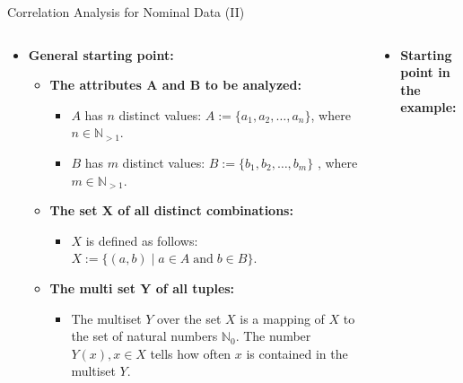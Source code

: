 \begin{frame}{Correlation Analysis for Nominal Data (II)}
	\begin{columns}
		\begin{column}{0.5\textwidth}
			\begin{itemize}
				\item \textbf{General starting point:}
				      \begin{itemize}
					      \item \textbf{The attributes A and B to be analyzed:}
					            \begin{itemize}
						            \item $A$ has $n$ distinct values: $A :=
							                  \{a_1, a_2, \ldots, a_n\}$, where $n \in
							                  \mathbb{N}_{>1}$.
						            \item $B$ has $m$ distinct values: $B :=
							                  \{b_1, b_2, \ldots, b_m\}$ , where $m \in
							                  \mathbb{N}_{>1}$.
					            \end{itemize}
					      \item \textbf{The set X of all distinct combinations:}
					            \begin{itemize}
						            \item $X$ is defined as follows: \\
						                  $X := \{(a, b) \; \vert \; a \in A \;
							                  \text{and} \; b \in B\}$.
					            \end{itemize}
					      \item \textbf{The multi set Y of all tuples:}
					            \begin{itemize}
						            \item The multiset $Y$ over the set $X$
						                  is a mapping of $X$ to the set of natural
						                  numbers $\mathbb{N}_{0}$.
						                  The number $Y(x), x \in X$ tells
						                  how often $x$ is contained in the multiset
						                  $Y$.
					            \end{itemize}
				      \end{itemize}
			\end{itemize}
		\end{column}
		\begin{column}{0.5\textwidth}
			\begin{itemize}
				\item \textbf{Starting point in the example:}

\end{itemize}
\end{column}
\end{columns}
\end{frame}
